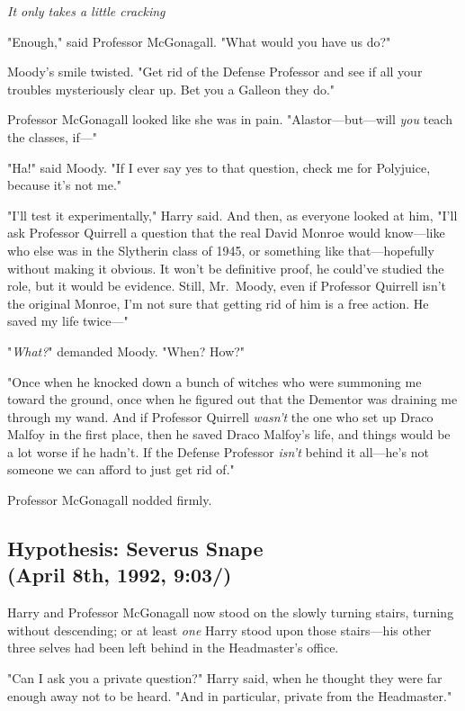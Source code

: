 \emph{It only takes a little cracking{\el}}

"Enough," said Professor McGonagall. "What would you have us do?"

Moody's smile twisted. "Get rid of the Defense Professor and see if all your
troubles mysteriously clear up. Bet you a Galleon they do."

Professor McGonagall looked like she was in pain. "Alastor---but---will
\emph{you} teach the classes, if---"

"Ha!" said Moody. "If I ever say yes to that question, check me for Polyjuice,
because it's not me."

"I'll test it experimentally," Harry said. And then, as everyone looked at him,
"I'll ask Professor Quirrell a question that the real David Monroe would
know---like who else was in the Slytherin class of 1945, or something like
that---hopefully without making it obvious. It won't be definitive proof, he
could've studied the role, but it would be evidence. Still, Mr.~Moody, even if
Professor Quirrell isn't the original Monroe, I'm not sure that getting rid of
him is a free action. He saved my life twice---"

"\emph{What?}" demanded Moody. "When? How?"

"Once when he knocked down a bunch of witches who were summoning me toward the
ground, once when he figured out that the Dementor was draining me through my
wand. And if Professor Quirrell \emph{wasn't} the one who set up Draco Malfoy
in the first place, then he saved Draco Malfoy's life, and things would be a
lot worse if he hadn't. If the Defense Professor \emph{isn't} behind it
all---he's not someone we can afford to just get rid of."

Professor McGonagall nodded firmly.
\sbreak
\vspace{-2\baselineskip}
\subsection{Hypothesis: Severus Snape\\
(April 8th, 1992, 9:03\PM/)}

Harry and Professor McGonagall now stood on the slowly turning stairs, turning
without descending; or at least \emph{one} Harry stood upon those stairs---his
other three selves had been left behind in the Headmaster's office.

"Can I ask you a private question?" Harry said, when he thought they were far
enough away not to be heard. "And in particular, private from the Headmaster."

